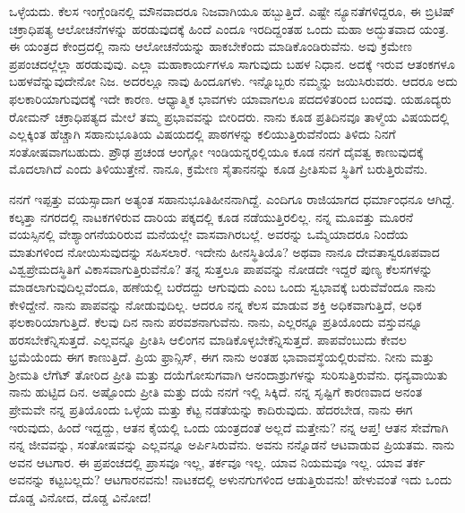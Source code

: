 ಒಳ್ಳೆಯದು. ಕೆಲಸ ಇಂಗ್ಲೆಂಡಿನಲ್ಲಿ ಮೌನವಾದರೂ ನಿಜವಾಗಿಯೂ ಹಬ್ಬುತ್ತಿದೆ. ಎಷ್ಟೇ ನ್ಯೂನತೆಗಳಿದ್ದರೂ, ಈ ಬ್ರಿಟಿಷ್ ಚಕ್ರಾಧಿಪತ್ಯ ಆಲೋಚನೆಗಳನ್ನು ಹರಡುವುದಕ್ಕೆ ಹಿಂದೆ ಎಂದೂ ಇರದಿದ್ದಂತಹ ಒಂದು ಮಹಾ ಅದ್ಭುತವಾದ ಯಂತ್ರ. ಈ ಯಂತ್ರದ ಕೇಂದ್ರದಲ್ಲಿ ನಾನು ಆಲೋಚನೆಯನ್ನು ಹಾಕಬೇಕೆಂದು ಮಾಡಿಕೊಂಡಿರುವೆನು. ಅವು ಕ್ರಮೇಣ ಪ್ರಪಂಚದಲ್ಲೆಲ್ಲಾ ಹರಡುವುವು. ಎಲ್ಲಾ ಮಹಾಕಾರ್ಯಗಳೂ ಸಾಗುವುದು ಬಹಳ ನಿಧಾನ. ಅದಕ್ಕೆ ಇರುವ ಆತಂಕಗಳೂ ಬಹಳವೆನ್ನುವುದೇನೋ ನಿಜ. ಅದರಲ್ಲೂ ನಾವು ಹಿಂದೂಗಳು. ಇನ್ನೊಬ್ಬರು ನಮ್ಮನ್ನು ಜಯಿಸಿರುವರು. ಆದರೂ ಅದು ಫಲಕಾರಿಯಾಗುವುದಕ್ಕೆ ಇದೇ ಕಾರಣ. ಆಧ್ಯಾತ್ಮಿಕ ಭಾವಗಳು ಯಾವಾಗಲೂ ಪದದಳಿತರಿಂದ ಬಂದವು. ಯಹೂದ್ಯರು ರೋಮನ್ ಚಕ್ರಾಧಿಪತ್ಯದ ಮೇಲೆ ತಮ್ಮ ಪ್ರಭಾವವನ್ನು ಬೀರಿದರು. ನಾನು ಕೂಡ ಪ್ರತಿದಿನವೂ ತಾಳ್ಮೆಯ ವಿಷಯದಲ್ಲಿ ಎಲ್ಲಕ್ಕಿಂತ ಹೆಚ್ಚಾಗಿ ಸಹಾನುಭೂತಿಯ ವಿಷಯದಲ್ಲಿ ಪಾಠಗಳನ್ನು ಕಲಿಯುತ್ತಿರುವೆನೆಂದು ತಿಳಿದು ನಿನಗೆ ಸಂತೋಷವಾಗಬಹುದು. ಪ್ರೌಢ ಪ್ರಚಂಡ ಆಂಗ್ಲೋ ಇಂಡಿಯನ್ನರಲ್ಲಿಯೂ ಕೂಡ ನನಗೆ ದೈವತ್ವ ಕಾಣುವುದಕ್ಕೆ ಮೊದಲಾಗಿದೆ ಎಂದು ತಿಳಿಯುತ್ತೇನೆ. ನಾನೂ, ಕ್ರಮೇಣ ಸೈತಾನನನ್ನು ಕೂಡ ಪ್ರೀತಿಸುವ ಸ್ಥಿತಿಗೆ ಬರುತ್ತಿರುವೆನು.

\vspace{0.2cm}

ನನಗೆ ಇಪ್ಪತ್ತು ವಯಸ್ಸಾದಾಗ ಅತ್ಯಂತ ಸಹಾನುಭೂತಿಹೀನನಾಗಿದ್ದೆ. ಎಂದಿಗೂ ರಾಜಿಯಾಗದ ಧರ್ಮಾಂಧನೂ ಆಗಿದ್ದೆ. ಕಲ್ಕತ್ತಾ ನಗರದಲ್ಲಿ ನಾಟಕಗಳಿರುವ ದಾರಿಯ ಪಕ್ಕದಲ್ಲಿ ಕೂಡ ನಡೆಯುತ್ತಿರಲಿಲ್ಲ. ನನ್ನ ಮೂವತ್ತು ಮೂರನೆ ವಯಸ್ಸಿನಲ್ಲಿ ವೇಶ್ಯಾಂಗನೆಯರಿರುವ ಮನೆಯಲ್ಲೇ ವಾಸವಾಗಿರಬಲ್ಲೆ. ಅವರನ್ನು ಒಮ್ಮೆಯಾದರೂ ನಿಂದೆಯ ಮಾತುಗಳಿಂದ ನೋಯಿಸುವುದನ್ನು ಸಹಿಸಲಾರೆ. ಇದೇನು ಹೀನಸ್ಥಿತಿಯೊ? ಅಥವಾ ನಾನೂ ದೇವತಾಸ್ವರೂಪವಾದ ವಿಶ್ವಪ್ರೇಮದಸ್ಥಿತಿಗೆ ವಿಕಾಸವಾಗುತ್ತಿರುವೆನೊ? ತನ್ನ ಸುತ್ತಲೂ ಪಾಪವನ್ನು ನೋಡದೇ ಇದ್ದರೆ ಪುಣ್ಯ ಕೆಲಸಗಳನ್ನು ಮಾಡಲಾಗುವುದಿಲ್ಲವೆಂದೂ, ಹಣೆಯಲ್ಲಿ ಬರೆದದ್ದು ಆಗುವುದು ಎಂಬ ಒಂದು ಸ್ವಭಾವಕ್ಕೆ ಬರುವೆವೆಂದೂ ನಾನು ಕೇಳಿದ್ದೇನೆ. ನಾನು ಪಾಪವನ್ನು ನೋಡುವುದಿಲ್ಲ. ಆದರೂ ನನ್ನ ಕೆಲಸ ಮಾಡುವ ಶಕ್ತಿ ಅಧಿಕವಾಗುತ್ತಿದೆ, ಅಧಿಕ ಫಲಕಾರಿಯಾಗುತ್ತಿದೆ. ಕೆಲವು ದಿನ ನಾನು ಪರವಶನಾಗುವೆನು. ನಾನು, ಎಲ್ಲರನ್ನೂ ಪ್ರತಿಯೊಂದು ವಸ್ತುವನ್ನೂ ಹರಸಬೇಕೆನ್ನಿಸುತ್ತದೆ. ಎಲ್ಲವನ್ನೂ ಪ್ರೀತಿಸಿ ಆಲಿಂಗನ ಮಾಡಿಕೊಳ್ಳಬೇಕೆನ್ನಿಸುತ್ತದೆ. ಪಾಪವೆಂಬುದು ಕೇವಲ ಭ್ರಮೆಯೆಂದು ಈಗ ಕಾಣುತ್ತಿದೆ. ಪ್ರಿಯ ಫ್ರಾನ್ಸಿಸ್, ಈಗ ನಾನು ಅಂತಹ ಭಾವಾವಸ್ಥೆಯಲ್ಲಿರುವೆನು. ನೀನು ಮತ್ತು ಶ‍್ರೀಮತಿ ಲೆಗೆಟ್ ತೋರಿದ ಪ್ರೀತಿ ಮತ್ತು ದಯೆಗೋಸುಗವಾಗಿ ಆನಂದಾಶ್ರುಗಳನ್ನು ಸುರಿಸುತ್ತಿರುವೆನು. ಧನ್ಯವಾಯಿತು ನಾನು ಹುಟ್ಟಿದ ದಿನ. ಅಷ್ಟೊಂದು ಪ್ರೀತಿ ಮತ್ತು ದಯೆ ನನಗೆ ಇಲ್ಲಿ ಸಿಕ್ಕಿದೆ. ನನ್ನ ಸೃಷ್ಟಿಗೆ ಕಾರಣವಾದ ಅನಂತ ಪ್ರೇಮವೇ ನನ್ನ ಪ್ರತಿಯೊಂದು ಒಳ್ಳೆಯ ಮತ್ತು ಕೆಟ್ಟ ನಡತೆಯನ್ನು ಕಾದಿರುವುದು. ಹೆದರಬೇಡ, ನಾನು ಈಗ ಇರುವುದು, ಹಿಂದೆ ಇದ್ದದ್ದು, ಆತನ ಕೈಯಲ್ಲಿ ಒಂದು ಯಂತ್ರದಂತೆ ಅಲ್ಲದೆ ಮತ್ತೇನು? ನನ್ನ ಆಪ್ತ! ಆತನ ಸೇವೆಗಾಗಿ ನನ್ನ ಜೀವವನ್ನು, ಸಂತೋಷವನ್ನು ಎಲ್ಲವನ್ನೂ ಅರ್ಪಿಸಿರುವೆನು. ಅವನು ನನ್ನೊಡನೆ ಆಟವಾಡುವ ಪ್ರಿಯತಮ. ನಾನು ಅವನ ಆಟಗಾರ. ಈ ಪ್ರಪಂಚದಲ್ಲಿ ಪ್ರಾಸವೂ ಇಲ್ಲ, ತರ್ಕವೂ ಇಲ್ಲ. ಯಾವ ನಿಯಮವೂ ಇಲ್ಲ. ಯಾವ ತರ್ಕ ಅವನನ್ನು ಕಟ್ಟಬಲ್ಲದು? ಆಟಗಾರನವನು! ನಾಟಕದಲ್ಲಿ ಅಳುನಗುಗಳಿಂದ ಆಡುತ್ತಿರುವನು! ಹೇಳುವಂತೆ ಇದು ಒಂದು ದೊಡ್ಡ ವಿನೋದ, ದೊಡ್ಡ ವಿನೋದ!


\vspace{0.2cm}

